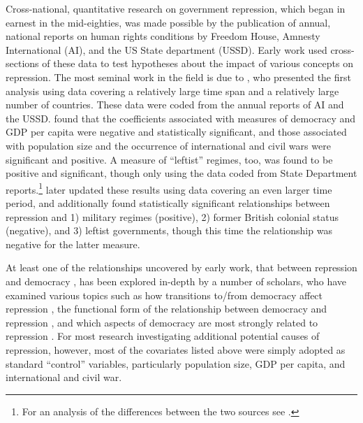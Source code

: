 \documentclass[12pt]{article}
\begin{document}
Cross-national, quantitative research on government repression, which began in earnest in the mid-eighties, was made possible by the publication of annual, national reports on human rights conditions by Freedom House, Amnesty International (AI), and the US State department (USSD). Early work used cross-sections of these data to test hypotheses about the impact of various concepts on repression. The most seminal work in the field is due to \citet{PoeTate1994}, who presented the first analysis using data covering a relatively large time span and a relatively large number of countries. These data were coded from the annual reports of AI and the USSD. \citet{PoeTate1994} found that the coefficients associated with measures of democracy and GDP per capita were negative and statistically significant, and those associated with population size and the occurrence of international and civil wars were significant and positive. A measure of ``leftist'' regimes, too, was found to be positive and significant, though only using the data coded from State Department reports.\footnote{For an analysis of the differences between the two sources see \citet{Poe2001}.} \citet{Poeetal1999} later updated these results using data covering an even larger time period, and additionally found statistically significant relationships between repression and 1) military regimes (positive), 2) former British colonial status (negative), and 3) leftist governments, though this time the relationship was negative for the latter measure. 

At least one of the relationships uncovered by early work, that between repression and democracy \citep{Henderson1991,PoeTate1994}, has been explored in-depth by a number of scholars, who have examined various topics such as how transitions to/from democracy affect repression \citep{Davenport1999}, the functional form of the relationship between democracy and repression \citep{Fein1995,DavenportArmstrong2004}, and which aspects of democracy are most strongly related to repression \citep{BDMetal2005, Davenport2007}. For most research investigating additional potential causes of repression, however, most of the covariates listed above were simply adopted as standard ``control'' variables, particularly population size, GDP per capita, and international and civil war. 
\end{document}
